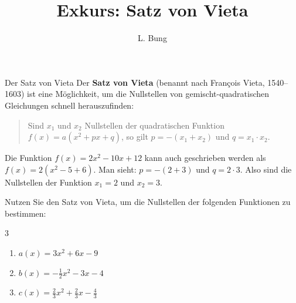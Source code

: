\documentclass[11pt, a4paper, oneside]{article}
\begin{document}
	\author{L. Bung}
	\title{Exkurs: Satz von Vieta}
	\subject{Mathematik}
	\maketitle
	
	\begin{hint}{Der Satz von Vieta}
		Der \textbf{Satz von Vieta} (benannt nach Fran\c{c}ois Vieta, 1540--1603) ist eine Möglichkeit, um die Nullstellen von gemischt-quadratischen Gleichungen schnell herauszufinden:
		
		\begin{quote}
			Sind $x_1$ und $x_2$ Nullstellen der quadratischen Funktion $f(x) = a(x^2+px+q)$, so gilt $p = -(x_1 + x_2)$ und $q = x_1 \cdot x_2$.
		\end{quote}
		
		Die Funktion $f(x) = 2x^2-10x+12$ kann auch geschrieben werden als $f(x) = 2(x^2-5+6)$.
		Man sieht: $p = -(2+3)$ und $q = 2 \cdot 3$.
		Also sind die Nullstellen der Funktion $x_1 = 2$ und $x_2 = 3$.
	\end{hint}
	
	
	Nutzen Sie den Satz von Vieta, um die Nullstellen der folgenden Funktionen zu bestimmen:
	
	\begin{multicols}{3}
		\begin{enumerate}[label=\alph*)]
			\item $a(x) = 3x^2+6x-9$
			\item $b(x) = -\frac{1}{2}x^2-3x-4$
			\item $c(x) = \frac{2}{3}x^2+\frac{2}{3}x-\frac{4}{3}$
		\end{enumerate}
	\end{multicols}
	
	\checkered[11cm]
	
	\let\clearpage\relax
\end{document}
